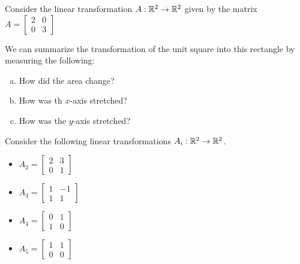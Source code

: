 
\begin{applicationActivities}{1}{25}

\begin{activity}{0}
Consider the linear transformation $A : \mathbb{R}^2 \rightarrow \mathbb{R}^2$ given by the matrix $A = \begin{bmatrix} 2 & 0 \\ 0 & 3 \end{bmatrix}$

\begin{center}
\end{center}

We can summarize the transformation of the unit square into this rectangle by measuring the following:

\begin{enumerate}[(a)]
\item How did the area change?
\item How was th $x$-axis stretched?
\item How was the $y$-axis stretched?
\end{enumerate}

\end{activity}


\begin{activity}{0}
Consider the following linear transformations  $A_i: \mathbb{R}^2 \rightarrow \mathbb{R}^2$.
\begin{itemize}
\item $A_2 = \begin{bmatrix} 2 & 3 \\ 0 & 1 \end{bmatrix}$
\item $A_3 = \begin{bmatrix} 1 & -1 \\ 1 & 1 \end{bmatrix}$
\item $A_4 = \begin{bmatrix} 0 & 1 \\ 1 & 0 \end{bmatrix}$
\item $A_5 = \begin{bmatrix} 1 & 1 \\ 0 & 0 \end{bmatrix}$
\end{itemize}


\end{activity}
\end{applicationActivities}
